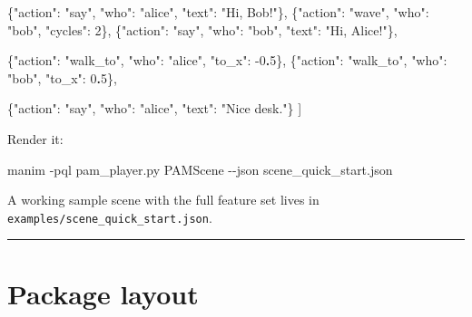 \documentclass[
  12pt,
  letterpaper,
]{book}
\newenvironment{Shaded}{}{}
\newcommand{\AttributeTok}[1]{\textcolor[rgb]{0.49,0.56,0.16}{#1}}
\newcommand{\DataTypeTok}[1]{\textcolor[rgb]{0.56,0.13,0.00}{#1}}
\newcommand{\DecValTok}[1]{\textcolor[rgb]{0.25,0.63,0.44}{#1}}
\newcommand{\ErrorTok}[1]{\textcolor[rgb]{1.00,0.00,0.00}{\textbf{#1}}}
\newcommand{\ExtensionTok}[1]{#1}
\newcommand{\FunctionTok}[1]{\textcolor[rgb]{0.02,0.16,0.49}{#1}}
\newcommand{\NormalTok}[1]{#1}
\newcommand{\OtherTok}[1]{\textcolor[rgb]{0.00,0.44,0.13}{#1}}
\newcommand{\StringTok}[1]{\textcolor[rgb]{0.25,0.44,0.63}{#1}}
\begin{document}
\begin{Shaded}
\begin{Highlighting}[]
  \FunctionTok{\{}\DataTypeTok{"action"}\FunctionTok{:} \StringTok{"say"}\FunctionTok{,}  \DataTypeTok{"who"}\FunctionTok{:} \StringTok{"alice"}\FunctionTok{,} \DataTypeTok{"text"}\FunctionTok{:} \StringTok{"Hi, Bob!"}\FunctionTok{\}}\OtherTok{,}
  \FunctionTok{\{}\DataTypeTok{"action"}\FunctionTok{:} \StringTok{"wave"}\FunctionTok{,} \DataTypeTok{"who"}\FunctionTok{:} \StringTok{"bob"}\FunctionTok{,} \DataTypeTok{"cycles"}\FunctionTok{:} \DecValTok{2}\FunctionTok{\}}\OtherTok{,}
  \FunctionTok{\{}\DataTypeTok{"action"}\FunctionTok{:} \StringTok{"say"}\FunctionTok{,}  \DataTypeTok{"who"}\FunctionTok{:} \StringTok{"bob"}\FunctionTok{,}   \DataTypeTok{"text"}\FunctionTok{:} \StringTok{"Hi, Alice!"}\FunctionTok{\}}\OtherTok{,}

  \FunctionTok{\{}\DataTypeTok{"action"}\FunctionTok{:} \StringTok{"walk\_to"}\FunctionTok{,} \DataTypeTok{"who"}\FunctionTok{:} \StringTok{"alice"}\FunctionTok{,} \DataTypeTok{"to\_x"}\FunctionTok{:} \DecValTok{{-}0}\ErrorTok{.}\DecValTok{5}\FunctionTok{\}}\OtherTok{,}
  \FunctionTok{\{}\DataTypeTok{"action"}\FunctionTok{:} \StringTok{"walk\_to"}\FunctionTok{,} \DataTypeTok{"who"}\FunctionTok{:} \StringTok{"bob"}\FunctionTok{,}   \DataTypeTok{"to\_x"}\FunctionTok{:}  \DecValTok{0}\ErrorTok{.}\DecValTok{5}\FunctionTok{\}}\OtherTok{,}

  \FunctionTok{\{}\DataTypeTok{"action"}\FunctionTok{:} \StringTok{"say"}\FunctionTok{,} \DataTypeTok{"who"}\FunctionTok{:} \StringTok{"alice"}\FunctionTok{,} \DataTypeTok{"text"}\FunctionTok{:} \StringTok{"Nice desk."}\FunctionTok{\}}
\OtherTok{]}
\end{Highlighting}
\end{Shaded}

Render it:

\begin{Shaded}
\begin{Highlighting}[]
\ExtensionTok{manim} \AttributeTok{{-}pql}\NormalTok{ pam\_player.py PAMScene }\AttributeTok{{-}{-}json}\NormalTok{ scene\_quick\_start.json}
\end{Highlighting}
\end{Shaded}

A working sample scene with the full feature set lives in
\texttt{examples/scene\_quick\_start.json}.

\begin{center}\rule{0.5\linewidth}{0.5pt}\end{center}

\section{Package layout}\label{package-layout}
\end{document}
